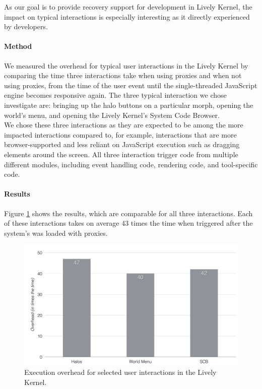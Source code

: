 As our goal is to provide recovery support for development in Lively Kernel, the impact on typical interactions is especially interesting as it directly experienced by developers.

\paragraph{Method}
We measured the overhead for typical user interactions in the Lively Kernel by comparing the time three interactions take when using proxies and when not using proxies, from the time of the user event until the single-threaded JavaScript engine becomes responsive again.
The three typical interaction we chose investigate are: bringing up the halo buttons on a particular morph, opening the world's menu, and opening the Lively Kernel's System Code Browser.\\
We chose these three interactions as they are expected to be among the more impacted interactions compared to, for example, interactions that are more browser-supported and less reliant on JavaScript execution such as dragging elements around the screen.
All three interaction trigger code from multiple different modules, including event handling code, rendering code, and tool-specific code.

\paragraph{Results}
Figure \ref{fig:LivelyInteractionsOverhead} shows the results, which are comparable for all three interactions.
Each of these interactions takes on average 43 times the time when triggered after the system's was loaded with proxies.

\begin{figure}[h]
    \centering
    \includegraphics[width=\textwidth]{figures/6_evaluation/4_LivelyInteractionsOverhead.pdf}
    \caption{Execution overhead for selected user interactions in the Lively Kernel.}
    \label{fig:LivelyInteractionsOverhead}
\end{figure}


